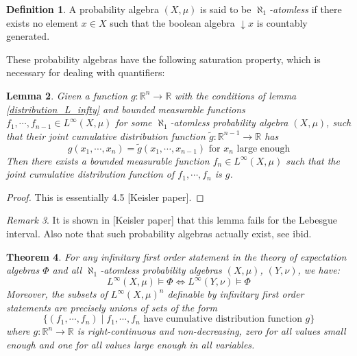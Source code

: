 \documentclass[a4paper]{amsproc}
\theoremstyle{plain}
\newtheorem{theorem}{Theorem}[section]
\newtheorem{lemma}[theorem]{Lemma}
\theoremstyle{definition}
\newtheorem{definition}[theorem]{Definition}
\theoremstyle{remark}
\newtheorem{remark}[theorem]{Remark}
\numberwithin{equation}{section}
\begin{document}
\begin{definition} A probability algebra $(X,\mu)$ is said to be $\aleph_1$\emph{-atomless} if there exists no element $x\in X$ such that the boolean algebra $\downarrow x$ is countably generated.
\end{definition}
These probability algebras have the following saturation property, which is necessary for dealing with quantifiers:
\begin{lemma} Given a function $g:\mathbb{R}^n\rightarrow \mathbb{R}$ with the conditions of lemma \ref{distribution_L_infty} and bounded measurable functions $f_1,\cdots, f_{n-1}\in L^\infty(X,\mu)$ for some $\aleph_1$-atomless probability algebra $(X,\mu)$, such that their joint cumulative distribution function $\tilde{g}:\mathbb{R}^{n-1}\rightarrow \mathbb{R}$ has
\[g(x_1,\cdots, x_n)=\tilde{g}(x_1,\cdots, x_{n-1}) \text{ for }x_n\text{ large enough} \]
Then there exists a bounded measurable function $f_n\in L^\infty(X,\mu)$ such that the joint cumulative distribution function of $f_1,\cdots,f_n $ is $g$.
\end{lemma}
\begin{proof}
This is essentially 4.5 [Keisler paper].
\end{proof}
\begin{remark} It is shown in [Keisler paper] that this lemma fails for the Lebesgue interval. Also note that such probability algebras actually exist, see ibid.
\end{remark}
\begin{theorem}
For any infinitary first order statement in the theory of expectation algebras $\Phi$ and all $\aleph_1$-atomless probability algebras $(X,\mu)$, $(Y,\nu)$, we have:
\[L^\infty(X,\mu)\vDash\Phi \iff L^\infty(Y,\nu)\vDash\Phi \]
Moreover, the subsets of $L^\infty(X,\mu)^n$ definable by infinitary first order statements are precisely unions of sets of the form
\[\{(f_1,\cdots,f_n)\mid f_1,\cdots,f_n \text{ have cumulative distribution function }g \} \]
where $g:\mathbb{R}^n\rightarrow\mathbb{R}$ is right-continuous and non-decreasing, zero for all values small enough and one for all values large enough in all variables.
\end{theorem}
\end{document}
